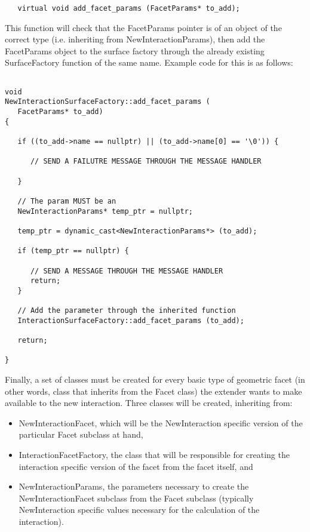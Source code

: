 \begin{verbatim}
   virtual void add_facet_params (FacetParams* to_add);
\end{verbatim}

This function will check that the FacetParams pointer is of an object
of the correct type (i.e. inheriting from NewInteractionParams), then
add the FacetParams object to the surface factory through the already
existing SurfaceFactory function of the same name. Example code
for this is as follows:

\begin{verbatim}

void
NewInteractionSurfaceFactory::add_facet_params (
   FacetParams* to_add)
{

   if ((to_add->name == nullptr) || (to_add->name[0] == '\0')) {

      // SEND A FAILUTRE MESSAGE THROUGH THE MESSAGE HANDLER

   }

   // The param MUST be an
   NewInteractionParams* temp_ptr = nullptr;

   temp_ptr = dynamic_cast<NewInteractionParams*> (to_add);

   if (temp_ptr == nullptr) {

      // SEND A MESSAGE THROUGH THE MESSAGE HANDLER
      return;
   }

   // Add the parameter through the inherited function
   InteractionSurfaceFactory::add_facet_params (to_add);

   return;

}
\end{verbatim}

Finally, a set of classes must be created for every basic type of geometric facet
(in other words, class that inherits from the Facet class) the extender
wants to make available to the new interaction. Three classes will be created,
inheriting from:

\begin{itemize}
\item{NewInteractionFacet}, which will be the NewInteraction specific version
of the particular Facet subclass at hand,
\item{InteractionFacetFactory}, the class that will be responsible for creating
the interaction specific version of the facet from the facet itself, and
\item{NewInteractionParams}, the parameters necessary to create the
NewInteractionFacet subclass from the Facet subclass (typically NewInteraction
specific values necessary for the calculation of the interaction).
\end{itemize}

